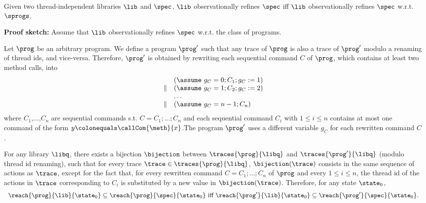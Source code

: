 \begin{lemma}\label{lemma:equiv1}
Given two thread-independent libraries $\lib$ and $\spec$, $\lib$ observationally refines $\spec$ iff $\lib$ observationally refines $\spec$ w.r.t. $\sprogs$.
\end{lemma}
\noindent
{\bf Proof sketch:} Assume that $\lib$ observationally refines $\spec$ w.r.t. the class of {\simple} programs.

Let $\prog$ be an arbitrary program. We define a {\simple} program $\prog'$ such that any trace of $\prog$ is also a trace of $\prog'$ modulo a renaming of thread ids, and vice-versa. 
Therefore, $\prog'$ is obtained by rewriting each sequential command $C$ of $\prog$, which contains at least two method calls, into 
\[
\begin{array}{ll}
&(\assume\ g_C=0; C_1;g_C:=1) \\
\| &(\assume\ g_C=1;C_2;g_C:=2) \\
&\ldots \\
\|&(\assume\ g_C=n-1;C_n)
\end{array}
\]
where $C_1$,$\ldots$,$C_n$ are sequential commands s.t. $C=C_1;\ldots;C_n$ and each sequential command $C_i$ with $1\leq i\leq n$ contains at most one command of the form $y \colonequals \callCom{\meth}{x}$.The program $\prog'$ uses a different variable $g_C$ for each rewritten command $C$.

For any library $\libq$, there exists a bijection $\bijection$ between $\traces{\prog}{\libq}$ and $\traces{\prog'}{\libq}$ (modulo thread id renaming), such that for every trace $\trace\in \traces{\prog}{\libq}$, $\bijection(\trace)$ consists in the same sequence of actions as $\trace$, except for the fact that, for every rewritten command $C=C_1;\ldots;C_n$ of $\prog$ and every $1\leq i\leq n$, the thread id of the actions in $\trace$ corresponding to $C_i$ is substituted by a new value in $\bijection(\trace)$. %
Therefore, 
for any state $\state_0$,
\[
\begin{array}{c}
\reach{\prog}{\lib}{\state_0}\subseteq \reach{\prog}{\spec}{\state_0} %
\mbox{ iff } %
\reach{\prog'}{\lib}{\state_0}\subseteq \reach{\prog'}{\spec}{\state_0}.
\end{array}
\]

